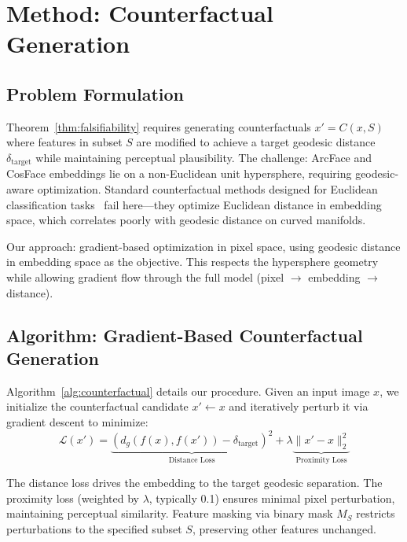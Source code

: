 \section{Method: Counterfactual Generation}
\label{sec:method}

\subsection{Problem Formulation}

Theorem~\ref{thm:falsifiability} requires generating counterfactuals $x' = C(x, S)$ where features in subset $S$ are modified to achieve a target geodesic distance $\delta_{\text{target}}$ while maintaining perceptual plausibility. The challenge: ArcFace and CosFace embeddings lie on a non-Euclidean unit hypersphere, requiring geodesic-aware optimization. Standard counterfactual methods designed for Euclidean classification tasks~\citep{wachter2017counterfactual} fail here—they optimize Euclidean distance in embedding space, which correlates poorly with geodesic distance on curved manifolds.

Our approach: gradient-based optimization in pixel space, using geodesic distance in embedding space as the objective. This respects the hypersphere geometry while allowing gradient flow through the full model (pixel $\to$ embedding $\to$ distance).

\subsection{Algorithm: Gradient-Based Counterfactual Generation}

Algorithm~\ref{alg:counterfactual} details our procedure. Given an input image $x$, we initialize the counterfactual candidate $x' \leftarrow x$ and iteratively perturb it via gradient descent to minimize:
\begin{equation}
\mathcal{L}(x') = \underbrace{\left(d_g(f(x), f(x')) - \delta_{\text{target}}\right)^2}_{\text{Distance Loss}} + \lambda \underbrace{\|x' - x\|_2^2}_{\text{Proximity Loss}}
\label{eq:loss}
\end{equation}

The distance loss drives the embedding to the target geodesic separation. The proximity loss (weighted by $\lambda$, typically 0.1) ensures minimal pixel perturbation, maintaining perceptual similarity. Feature masking via binary mask $M_S$ restricts perturbations to the specified subset $S$, preserving other features unchanged.

